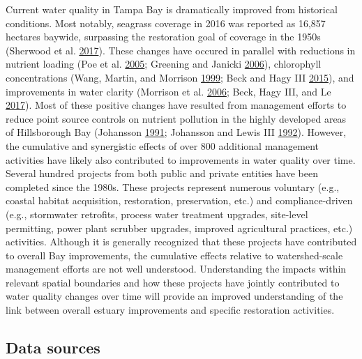 \documentclass[]{article}
\begin{document}
Current water quality in Tampa Bay is dramatically improved from
historical conditions. Most notably, seagrass coverage in 2016 was
reported as 16,857 hectares baywide, surpassing the restoration goal of
coverage in the 1950s (Sherwood et al.
\protect\hyperlink{ref-Sherwood17}{2017}). These changes have occured in
parallel with reductions in nutrient loading (Poe et al.
\protect\hyperlink{ref-Poe05}{2005}; Greening and Janicki
\protect\hyperlink{ref-Greening06}{2006}), chlorophyll concentrations
(Wang, Martin, and Morrison \protect\hyperlink{ref-Wang99}{1999}; Beck
and Hagy III \protect\hyperlink{ref-Beck15}{2015}), and improvements in
water clarity (Morrison et al. \protect\hyperlink{ref-Morrison06}{2006};
Beck, Hagy III, and Le \protect\hyperlink{ref-Beck17c}{2017}). Most of
these positive changes have resulted from management efforts to reduce
point source controls on nutrient pollution in the highly developed
areas of Hillsborough Bay (Johansson
\protect\hyperlink{ref-Johansson91}{1991}; Johansson and Lewis III
\protect\hyperlink{ref-Johansson92}{1992}). However, the cumulative and
synergistic effects of over 800 additional management activities have
likely also contributed to improvements in water quality over time.
Several hundred projects from both public and private entities have been
completed since the 1980s. These projects represent numerous voluntary
(e.g., coastal habitat acquisition, restoration, preservation, etc.) and
compliance-driven (e.g., stormwater retrofits, process water treatment
upgrades, site-level permitting, power plant scrubber upgrades, improved
agricultural practices, etc.) activities. Although it is generally
recognized that these projects have contributed to overall Bay
improvements, the cumulative effects relative to watershed-scale
management efforts are not well understood. Understanding the impacts
within relevant spatial boundaries and how these projects have jointly
contributed to water quality changes over time will provide an improved
understanding of the link between overall estuary improvements and
specific restoration activities.

\hypertarget{data-sources}{%
\subsection{Data sources}\label{data-sources}}
\end{document}
